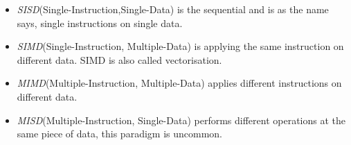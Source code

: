 \documentclass[10pt,a4paper]{report}
\begin{document}
\begin{itemize}
 \item \emph{SISD}(Single-Instruction,Single-Data) is the sequential and is as the name says, single instructions on single data\cite{introduction_hpc_hager}.
 \item \emph{SIMD}(Single-Instruction, Multiple-Data) is applying the same instruction on different data\cite{introduction_hpc_hager}. SIMD is also called vectorisation\cite{introduction_hpc_hager}.
 \item \emph{MIMD}(Multiple-Instruction, Multiple-Data) applies different instructions on different data\cite{introduction_hpc_hager}.
 \item \emph{MISD}(Multiple-Instruction, Single-Data) performs different operations at the same piece of data, this paradigm is uncommon\cite{introduction_hpc_hager, computer_arch_2003}.
\end{itemize}
\end{document}
